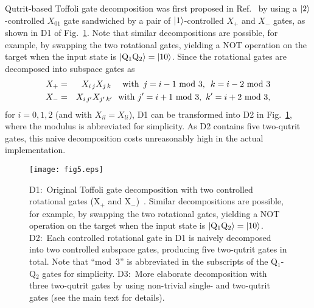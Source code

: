 
%





Qutrit-based Toffoli gate decomposition was first proposed in Ref.~\cite{gokhale2019} by using a $\ket{2}$-controlled $X_{01}$ gate sandwiched by a pair of $\ket{1}$-controlled $X_{+}$ and $X_{-}$ gates, as shown in D1 of Fig.~\ref{fig5}.
Note that similar decompositions are possible, for example, by swapping the two rotational gates, yielding a NOT operation on the target when the input state is $\ket{{\rm Q_1 Q_2}}=\ket{10}$.
Since the rotational gates are decomposed into subspace gates as
\begin{eqnarray}
X_{+} &=& X_{i\,j} X_{j\,k}\ \ \ \ {\rm with}\ \,j=i-1\ {\rm mod}\ 3,\ \,k=i-2\ {\rm mod}\ 3   \\
X_{-} &=& X_{i\,j'} X_{j'\,k'}\ \ {\rm with}\ j'=i+1\ {\rm mod}\ 3,\ k'=i+2\ {\rm mod}\ 3,
\end{eqnarray}
for $i=0,1,2$ (and with $X_{il} = X_{li}$), D1 can be transformed into D2 in Fig.~\ref{fig5}, where the modulus is abbreviated for simplicity.
As D2 contains five two-qutrit gates, this naive decomposition costs unreasonably high in the actual implementation.

\begin{figure}[b!]
\texttt{[image: fig5.eps]}
\caption{
D1:~Original Toffoli gate decomposition with two controlled rotational gates (X$_+$ and X$_-$)~\cite{gokhale2019}.
Similar decompositions are possible, for example, by swapping the two rotational gates, yielding a NOT operation on the target when the input state is $\ket{{\rm Q_1 Q_2}}=\ket{10}$.
D2:~Each controlled rotational gate in D1 is naively decomposed into two controlled subspace gates, producing five two-qutrit gates in total.
Note that ``mod~3'' is abbreviated in the subscripts of the Q$_1$-Q$_2$ gates for simplicity.
D3:~More elaborate decomposition with three two-qutrit gates by using non-trivial single- and two-qutrit gates (see the main text for details).
}
\label{fig5}
\end{figure}

